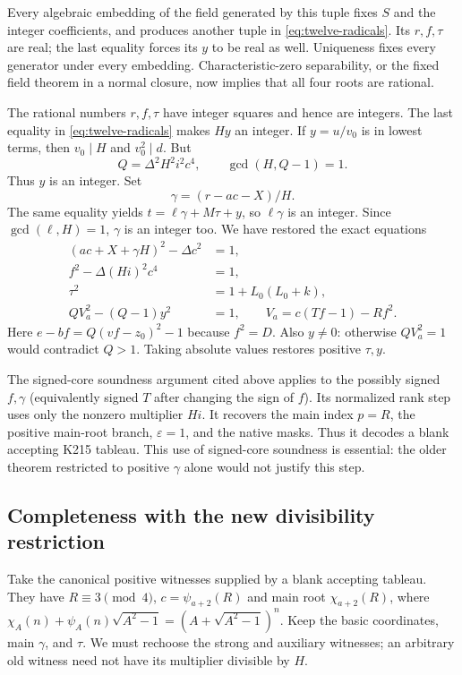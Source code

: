 Every algebraic embedding of the field generated by this tuple fixes
$S$ and the integer coefficients, and produces another tuple in
\eqref{eq:twelve-radicals}.  Its $r,f,\tau$ are real; the last equality
forces its $y$ to be real as well.  Uniqueness fixes every generator
under every embedding.  Characteristic-zero separability, or the fixed
field theorem in a normal closure, now implies that all four roots are
rational.

The rational numbers $r,f,\tau$ have integer squares and hence are
integers.  The last equality in \eqref{eq:twelve-radicals} makes $Hy$
an integer.  If $y=u/v_0$ is in lowest terms, then $v_0\mid H$ and
$v_0^2\mid d$.  But
\[
 Q=\Delta^2H^2i^2c^4,\qquad \gcd(H,Q-1)=1.
\]
Thus $y$ is an integer.  Set
\[
 \gamma=(r-ac-X)/H.
\]
The same equality yields $t=\ell\gamma+M\tau+y$, so
$\ell\gamma$ is an integer.  Since $\gcd(\ell,H)=1$, $\gamma$ is
an integer too.  We have restored the exact equations
\begin{align*}
 (ac+X+\gamma H)^2-\Delta c^2&=1,\\
 f^2-\Delta(Hi)^2c^4&=1,\\
 \tau^2&=1+L_0(L_0+k),\\
 QV_a^2-(Q-1)y^2&=1,
 \qquad V_a=c(Tf-1)-Rf^2.
\end{align*}
Here $e-bf=Q(vf-z_0)^2-1$ because $f^2=D$.
Also $y\ne0$: otherwise $QV_a^2=1$ would contradict $Q>1$.
Taking absolute values restores positive $\tau,y$.

The signed-core soundness argument cited above applies to the possibly
signed $f,\gamma$ (equivalently signed $T$ after changing the sign of
$f$).  Its normalized rank step uses only the nonzero multiplier $Hi$.
It recovers the main index $p=R$, the positive main-root branch,
$\varepsilon=1$, and the native masks.  Thus it decodes a blank
accepting K215 tableau.  This use of signed-core soundness is essential:
the older theorem restricted to positive $\gamma$ alone would not
justify this step.

\subsection{Completeness with the new divisibility restriction}

Take the canonical positive witnesses supplied by a blank accepting
tableau.  They have $R\equiv3\pmod4$,
$c=\psi_{a+2}(R)$ and main root $\chi_{a+2}(R)$, where
$\chi_A(n)+\psi_A(n)\sqrt{A^2-1}=(A+\sqrt{A^2-1})^n$.
Keep the basic coordinates, main $\gamma$, and $\tau$.  We must
rechoose the strong and auxiliary witnesses; an arbitrary old witness
need not have its multiplier divisible by $H$.

